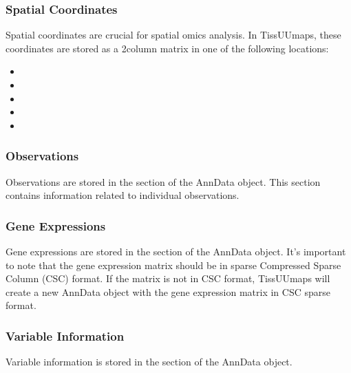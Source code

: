 \documentclass[letterpaper,10pt,english,openany,oneside]{sphinxmanual}
\begin{document}
\subsubsection{Spatial Coordinates}
\label{\detokenize{docs/advanced/anndata:spatial-coordinates}}
\sphinxAtStartPar
Spatial coordinates are crucial for spatial omics analysis. In TissUUmaps, these coordinates are stored as a 2\sphinxhyphen{}column matrix in one of the following locations:
\begin{itemize}
\item {} 
\sphinxAtStartPar
{}

\item {} 
\sphinxAtStartPar
{}

\item {} 
\sphinxAtStartPar
{}

\item {} 
\sphinxAtStartPar
{}

\item {} 
\sphinxAtStartPar
{}

\end{itemize}


\subsubsection{Observations}
\label{\detokenize{docs/advanced/anndata:observations}}
\sphinxAtStartPar
Observations are stored in the  section of the AnnData object. This section contains information related to individual observations.


\subsubsection{Gene Expressions}
\label{\detokenize{docs/advanced/anndata:gene-expressions}}
\sphinxAtStartPar
Gene expressions are stored in the  section of the AnnData object. It’s important to note that the gene expression matrix should be in sparse Compressed Sparse Column (CSC) format. If the matrix is not in CSC format, TissUUmaps will create a new AnnData object with the gene expression matrix in CSC sparse format.


\subsubsection{Variable Information}
\label{\detokenize{docs/advanced/anndata:variable-information}}
\sphinxAtStartPar
Variable information is stored in the  section of the AnnData object.
\end{document}

